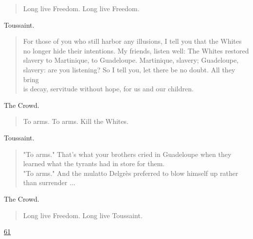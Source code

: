 \documentclass[letterpaper,article,12pt,oneside,notitlepage]{memoir}
\begin{document}
\begin{verse}
\hspace{1cm} Long live Freedom. Long live Freedom. \\
\end{verse}

\begin{center}Toussaint.\end{center}

\begin{verse}
\indent For those of you who still harbor any illusions, I tell you that the Whites no longer hide their intentions. My friends, listen well: The Whites restored slavery to Martinique, to Guadeloupe. Martinique, slavery; Guadeloupe, slavery: are you listening? So I tell you, let there be no doubt. All they bring \\
\indent is decay, servitude without hope, for us and our children. \\
\end{verse}

\begin{center}The Crowd.\end{center}

\begin{verse}
\hspace{1cm} To arms. To arms. Kill the Whites. \\
\end{verse}

\begin{center}Toussaint.\end{center}

\begin{verse}
\indent "To arms." That's what your brothers cried in Guadeloupe when they learned what the tyrants had in store for them.  \\
\indent "To arms." And the mulatto Delgrès preferred to blow himself up rather than surrender ...  \\
\end{verse}

\begin{center}The Crowd.\end{center}

\begin{verse}
\hspace{1cm} Long live Freedom. Long live Toussaint. \\
\end{verse}

\clearpage

\href{http://cesaire.elotroalex.com/chiens/chiens/p061.html}{61}
\end{document}
